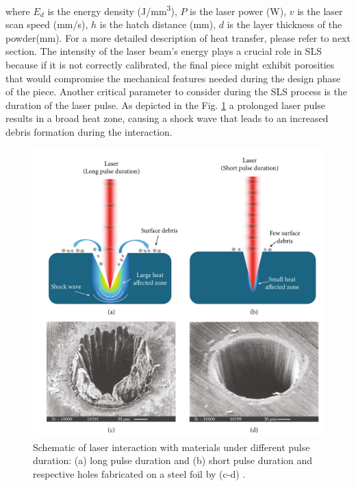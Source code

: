 where $E_d$ is the energy density (\unit{\joule/\milli\metre^3}), $P$ is the laser power (\unit{\watt}), $v$ is the laser scan speed (\unit{\milli\metre / \second}), $h$ is the hatch distance (\unit{\milli\metre}), $d$ is the layer thickness of the powder(\unit{\milli\metre}). For a more detailed description of heat transfer, please refer to next section. The intensity of the laser beam's energy plays a crucial role in SLS because if it is not correctly calibrated, the final piece might exhibit porosities that would compromise the mechanical features needed during the design phase of the piece. Another critical parameter to consider during the SLS process is the duration of the laser pulse. As depicted in the Fig. \ref{fig:pulsipulsiocomepulsi} a prolonged laser pulse results in a broad heat zone, causing a shock wave that leads to an increased debris formation during the interaction.
\begin{figure}
    \centering
    \includegraphics[scale=0.35]{Images/laserpulsing.png}
    \caption[Material absorptivity as function of wavelength.]{Schematic of laser interaction with materials under different pulse duration: (a) long pulse duration and (b) short pulse duration and respective holes fabricated on a steel foil by (c-d) \cite{lin_femtosecond_2021}.}
    \label{fig:pulsipulsiocomepulsi}
\end{figure}
